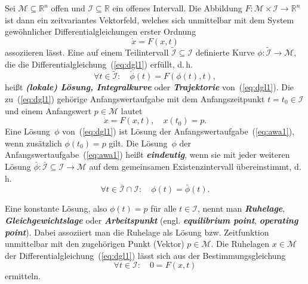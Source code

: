 Sei $\mathcal{M}\subseteq{\mathbb{R}}^{n}$ offen und $\mathcal{I}\subseteq{\mathbb{R}}$
ein offenes Intervall. Die Abbildung $F:\mathcal{M}\times\mathcal{I}\to{\mathbb{R}}^{n}$
ist dann ein zeitvariantes Vektorfeld, welches sich unmittelbar mit
dem System gewöhnlicher Differentialgleichungen erster Ordnung
\begin{equation}
\dot{x}=F(x,t)\label{eq:dgl1}
\end{equation}
assoziieren lässt. Eine auf einem Teilintervall $\tilde{\mathcal{I}}\subseteq\mathcal{I}$
definierte Kurve $\phi:\tilde{\mathcal{I}}\to\mathcal{M}$, die die
Differentialgleichung~(\ref{eq:dgl1}) erfüllt, d.\,h.
\[
\forall t\in\tilde{\mathcal{I}}:\quad\dot{\phi}(t)=F(\phi(t),t),
\]
heißt \textbf{\em (lokale) Lösung, Integralkurve}
oder \textbf{\em Trajektorie} von~(\ref{eq:dgl1}).
Die zu~(\ref{eq:dgl1}) gehörige Anfangswertaufgabe
mit dem Anfangszeitpunkt $t=t_{0}\in\mathcal{I}$ und einem Anfangswert
$p\in\mathcal{M}$ lautet
\begin{equation}
\dot{x}=F(x,t),\quad x(t_{0})=p.\label{eq:awa1}
\end{equation}
Eine Lösung~$\phi$ von~(\ref{eq:dgl1}) ist Lösung der Anfangswertaufgabe~(\ref{eq:awa1}),
wenn zusätzlich $\phi(t_{0})=p$ gilt. Die Lösung~$\phi$ der Anfangswertaufgabe~(\ref{eq:awa1})
heißt \textbf{\em eindeutig}, wenn sie mit jeder weiteren Lösung $\bar{\phi}:\bar{\mathcal{I}}\subseteq\mathcal{I}\to\mathcal{M}$
auf dem gemeinsamen Existenzintervall übereinstimmt, d.\,h.
\[
\forall t\in\bar{\mathcal{I}}\cap\mathcal{I}:\quad\phi(t)=\bar{\phi}(t).
\]

Eine konstante Lösung, also $\phi(t)=p$ für alle $t\in\mathcal{I}$,
nennt man \textbf{\em Ruhelage}, \textbf{\em Gleichgewichtslage}
oder \textbf{\em Arbeitspunkt} (engl. \textbf{\em equilibrium
point}, \textbf{\em operating point}). Dabei assoziiert man die Ruhelage
als Lösung bzw. Zeitfunktion unmittelbar mit den zugehörigen Punkt
(Vektor) $p\in\mathcal{M}$. Die Ruhelagen $x\in\mathcal{M}$ der
Differentialgleichung~(\ref{eq:dgl1}) lässt sich aus der Bestimmungsgleichung
\[
\forall t\in\mathcal{I}:\quad0=F(x,t)
\]
ermitteln.

